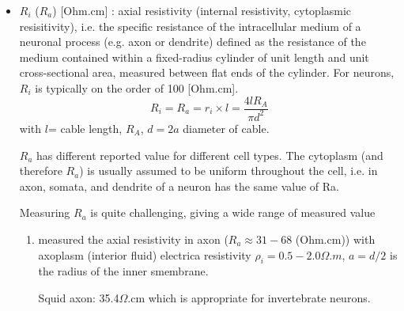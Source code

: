 \begin{enumerate}
\begin{itemize}
  
  \item $R_i$ ($R_a$) [Ohm.cm] : axial resistivity (internal resistivity,
  cytoplasmic resisitivity), i.e. the specific resistance of the intracellular medium of a
  neuronal process (e.g. axon or dendrite) defined as the resistance of the
  medium contained within a fixed-radius cylinder of unit length and unit
  cross-sectional area, measured between flat ends of the cylinder. For neurons,
  $R_i$ is typically on the order of 100 [Ohm.cm].
 \begin{equation}
 R_i = R_a = r_i \times l = \frac{4 l R_A}{\pi d^2}
 \end{equation}
 with $l$= cable length, $R_A$, $d=2a$ diameter of cable.

\label{sec:axial-resistivity}
\label{sec:cytoplasmic-resistivity}

$R_a$ has different reported value for different cell types.
The cytoplasm (and therefore $R_a$) is usually assumed to be uniform throughout
the cell, i.e. in axon, somata, and dendrite of a neuron has the same value of
Ra.

Measuring $R_a$ is quite challenging, giving a wide range of measured value
\begin{enumerate}
  \item \citep{carpenter1975} measured the axial resistivity in axon ($R_a \approx
31-68$ (Ohm.cm)) with axoplasm (interior fluid) electrica resistivity $\rho_i =
0.5-2.0 \Omega.m$, $a=d/2$ is the radius of the inner smembrane.

Squid axon: 35.4$\Omega$.cm which is appropriate for invertebrate neurons.



\end{enumerate}
\end{itemize}
\end{enumerate}
